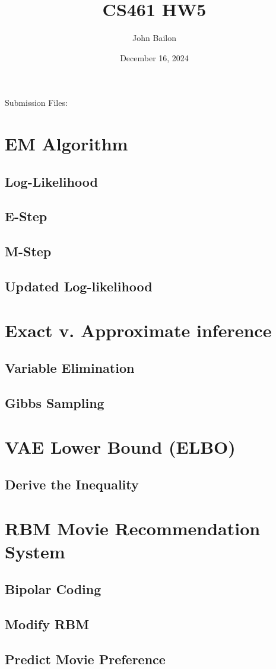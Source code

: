 \documentclass{article}
\title{CS461 HW5}
\author{John Bailon}
\date{December 16, 2024}
\begin{document}
\maketitle

\noindent
Submission Files:

\section{EM Algorithm}
\subsection{Log-Likelihood}
\subsection{E-Step}
\subsection{M-Step}
\subsection{Updated Log-likelihood}

\section{Exact v. Approximate inference}
\subsection{Variable Elimination}
\subsection{Gibbs Sampling}

\section{VAE Lower Bound (ELBO)}
\subsection{Derive the Inequality}

\section{RBM Movie Recommendation System}
\subsection{Bipolar Coding}
\subsection{Modify RBM}
\subsection{Predict Movie Preference}
\end{document}
